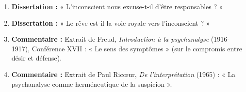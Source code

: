 \documentclass[11pt]{article}
\begin{document}
\begin{exercice}
\begin{enumerate}
\item \textbf{Dissertation :} « L'inconscient nous excuse-t-il d'être responsables ? »
\item \textbf{Dissertation :} « Le rêve est-il la voie royale vers l'inconscient ? »
\item \textbf{Commentaire :} Extrait de Freud, \emph{Introduction à la psychanalyse} (1916-1917), Conférence XVII : « Le sens des symptômes » (sur le compromis entre désir et défense).
\item \textbf{Commentaire :} Extrait de Paul Ricœur, \emph{De l'interprétation} (1965) : « La psychanalyse comme herméneutique de la suspicion ».
\end{enumerate}
\end{exercice}
\end{document}
